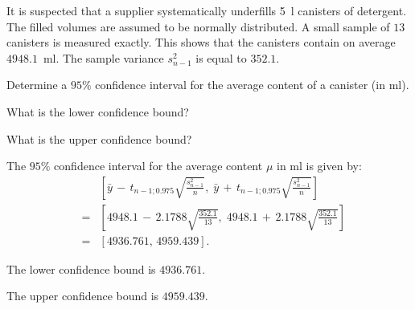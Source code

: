 

\begin{question}
It is suspected that a supplier systematically underfills 5~l canisters of detergent.
The filled volumes are assumed to be normally distributed. A small sample of $13$
canisters is measured exactly. This shows that the canisters contain on average
$4948.1$~ml. The sample variance $s^2_{n-1}$ is equal to $352.1$.

Determine a $95\%$ confidence interval for the average content of
a canister (in ml).

\begin{answerlist}
\item What is the lower confidence bound?
\item What is the upper confidence bound?
\end{answerlist}
\end{question}


\begin{solution}
The $95\%$ confidence interval for the average content $\mu$
in ml is given by:
\begin{eqnarray*}
&   & \left[\bar{y} \, - \, t_{n-1;0.975}\sqrt{\frac{s_{n-1}^2}{n}}, \;
  \bar{y} \, + \, t_{n-1;0.975}\sqrt{\frac{s_{n-1}^2}{n}}\right] \\
& = & \left[ 4948.1 \, - \, 2.1788\sqrt{\frac{352.1}{13}}, \;
             4948.1 \, + \, 2.1788\sqrt{\frac{352.1}{13}}\right] \\
& = & \left[4936.761, \, 4959.439\right].
\end{eqnarray*}

\begin{answerlist}
\item The lower confidence bound is $4936.761$.
\item The upper confidence bound is $4959.439$.
\end{answerlist}
\end{solution}


